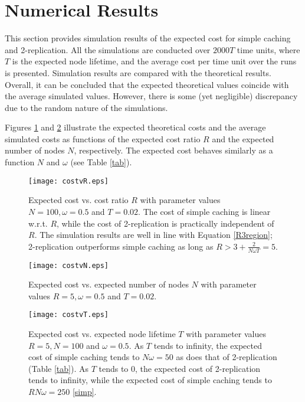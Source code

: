 \documentclass[10pt,conference]{IEEEtran}
\begin{document}
\newpage
\section{Numerical Results}\label{numericalresultssec}
This section provides simulation results of the expected cost for simple caching and 2-replication. All the simulations are conducted over $2000 T$ time units, where $T$ is the expected node lifetime, and the average cost per time unit over the runs is presented. Simulation results are compared with the theoretical results. Overall, it can be concluded that the expected theoretical values coincide with the average simulated values. However, there is some (yet negligible) discrepancy due to the random nature of the simulations.

Figures \ref{costvR} and \ref{costvN} 
illustrate the expected theoretical costs and the average simulated costs as
functions of the expected cost ratio $R$ and the expected number of nodes
$N$, respectively. The expected
cost behaves similarly as a function $N$ and $\omega$ (see Table
\ref{tab}). 

\begin{figure}[tbhp]
\centering \texttt{[image: costvR.eps]}
\caption{Expected cost vs. cost ratio $R$ with parameter values $N=100, \omega=0.5$ and $T=0.02$. The cost of simple caching is linear w.r.t. $R$, while the cost of 2-replication is practically independent of $R$. The simulation results are well in line with Equation \eqref{R3region}; 2-replication outperforms simple caching as long as $R > 3 + \frac{2}{N\omega T} = 5$.}
\label{costvR}
\end{figure}

\begin{figure}[tb]
\centering \texttt{[image: costvN.eps]}
\caption{Expected cost vs. expected number of nodes $N$ with parameter values $R=5, \omega=0.5$ and $T=0.02$.}
\label{costvN}
\end{figure}

\begin{figure}[tb]
\centering \texttt{[image: costvT.eps]}
\caption{Expected cost vs. expected node lifetime $T$ with parameter values $R= 5, N=100$ and $\omega=0.5$. As $T$ tends to infinity, the expected cost of simple caching tends to $N\omega=50$ as does that of 2-replication (Table \ref{tab}). As $T$ tends to $0$, the expected cost of 2-replication tends to infinity, while the expected cost of simple caching tends to $RN\omega = 250$ \eqref{simp}.}
\label{costvT}
\end{figure}
\end{document}
